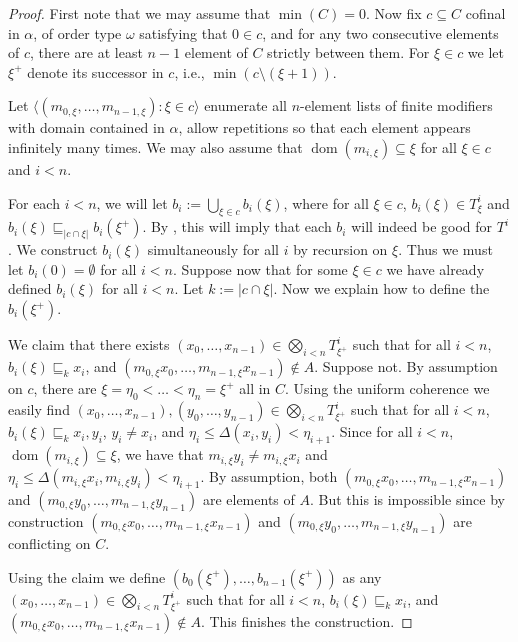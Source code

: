 \documentclass[10pt,a4paper]{amsart}
\theoremstyle{definition}
\newcommand{\seb}{\subseteq}
\newcommand{\setm}{\setminus}
\newcommand{\es}{\emptyset}
\newcommand{\tleq}{\sqsubseteq}
\newcommand{\tup}[1]{\langle#1\rangle}
\newcommand{\1}{\mathbf{1}}
\DeclareMathOperator{\dom}{dom}
\begin{document}
\begin{proof}
  First note that we may assume that $\min(C) = 0$.
  Now fix
  $c \seb C$ cofinal in $\alpha$, of order type $\omega$
  satisfying that $0 \in c$, and for any two consecutive elements of $c$,
  there are at least $n-1$ element of $C$ strictly between them.
  For $\xi \in c$
  we let $\xi^{+}$ denote its successor in $c$, i.e., $\min(c \setm (\xi +1))$.

  Let $\tup{(m_{0,\xi},\dots,m_{n-1,\xi}) : \xi \in c}$ enumerate all
  $n$-element lists
  of finite modifiers with domain contained in $\alpha$,
  allow repetitions so that each element
  appears infinitely many times. We may also assume that
  $\dom(m_{i,\xi}) \seb \xi$ for all $\xi \in c$ and $i < n$.

  For each $i < n$, we will let $b_{i} := \bigcup_{\xi \in c}b_{i}(\xi)$,
  where for all $\xi \in c$, $b_{i}(\xi) \in T^{i}_{\xi}$ and
  $b_{i}(\xi) \tleq_{|c \cap \xi|} b_{i}(\xi^{+})$. By ,
  this will imply that each $b_{i}$ will indeed be good for $T^{i}$.
  We construct
  $b_{i}(\xi)$ simultaneously for all $i$ by recursion on $\xi$.
  Thus we must let $b_{i}(0) = \es$ for all $i < n$. Suppose now that
  for some $\xi \in c$ we have already defined
  $b_{i}(\xi)$ for all $i < n$. Let $k := |c \cap \xi|$. Now we explain
  how to define the $b_{i}(\xi^{+})$.

  We claim that
  there exists
  $(x_{0},\dots,x_{n-1}) \in \bigotimes_{i <n}T^{i}_{\xi^{+}}$ such that
  for all $i <n$, $b_{i}(\xi) \tleq_{k} x_{i}$, and
  $(m_{0,\xi}x_{0},\dots,m_{n-1,\xi}x_{n-1}) \notin A$.
  Suppose not. By assumption on $c$,
  there are $\xi = \eta_{0} < \dots < \eta_{n} = \xi^{+}$ all in
  $C$.
  Using the uniform coherence we easily find
  $(x_{0},\dots,x_{n-1}),\allowbreak (y_{0},\dots,y_{n-1})
  \in \bigotimes_{i <n}T^{i}_{\xi^{+}}$ such that for all $i < n$,
  $b_{i}(\xi) \tleq_{k} x_{i},y_{i}$,
  $y_{i} \neq x_{i}$, and
  $\eta_{i} \le \Delta(x_{i},y_{i}) < \eta_{i+1}$.
  Since for all $i < n$, $\dom(m_{i,\xi}) \seb \xi$, we
  have that $m_{i,\xi}y_{i} \neq m_{i,\xi}x_{i}$ and
  $\eta_{i} \le \Delta(m_{i,\xi}x_{i},m_{i,\xi}y_{i}) < \eta_{i+1}$.
  By assumption, both
  $(m_{0,\xi}x_{0},\dots,m_{n-1,\xi}x_{n-1})$ and $(m_{0,\xi}y_{0},\dots,m_{n-1,\xi}y_{n-1})$
  are elements of $A$. But this is impossible since by construction
  $(m_{0,\xi}x_{0},\dots,m_{n-1,\xi}x_{n-1})$ and $(m_{0,\xi}y_{0},\dots,m_{n-1,\xi}y_{n-1})$
  are conflicting on $C$.
  
  Using the claim we define
  $(b_{0}(\xi^{+}),\dots,b_{n-1}(\xi^{+}))$
  as any $(x_{0},\dots,x_{n-1}) \in \bigotimes_{i <n}T^{i}_{\xi^{+}}$ such that
  for all $i <n$, $b_{i}(\xi) \tleq_{k} x_{i}$, and
  $(m_{0,\xi} x_{0},\dots,m_{n-1,\xi} x_{n-1}) \notin A$. This finishes the
  construction.
  

\end{proof}
\end{document}
